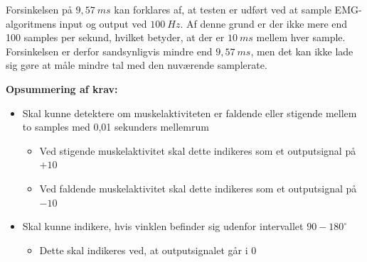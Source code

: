 Forsinkelsen på $9,57~ms$ kan forklares af, at testen er udført ved at sample EMG-algoritmens input og output ved $100~Hz$. Af denne grund er der ikke mere end 100 samples per sekund, hvilket betyder, at der er $10~ms$ mellem hver sample. Forsinkelsen er derfor sandsynligvis mindre end $9,57~ms$, men det kan ikke lade sig gøre at måle mindre tal med den nuværende samplerate. 

\vspace{3mm}
\textbf{Opsummering af krav:}
\begin{itemize}
\item Skal kunne detektere om muskelaktiviteten er faldende eller stigende mellem to samples med 0,01 sekunders mellemrum
\begin{itemize}
\item Ved stigende muskelaktivitet skal dette indikeres som et outputsignal på $+10$
\item Ved faldende muskelaktivitet skal dette indikeres som et outputsignal på $-10$
\end{itemize}
\item Skal kunne indikere, hvis vinklen befinder sig udenfor intervallet $90-180^{\circ}$
\begin{itemize}
\item Dette skal indikeres ved, at outputsignalet går i $0$
\end{itemize}
\end{itemize}